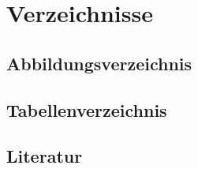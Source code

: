 \newpage
\section{Verzeichnisse}
\subsection{Abbildungsverzeichnis}
\subsection{Tabellenverzeichnis}
\subsection{Literatur}
%